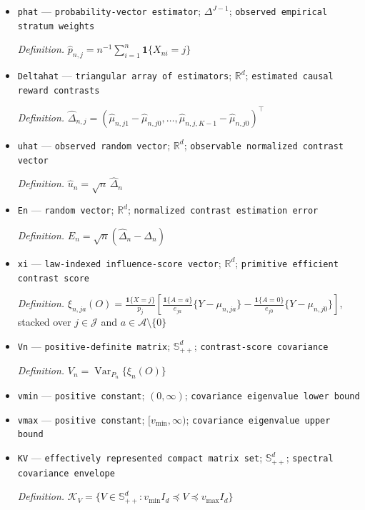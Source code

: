 \documentclass{article}
\begin{document}
\begin{itemize}
  \item \texttt{phat} --- \texttt{probability-\allowbreak{}vector estimator}; \(\Delta^{J-1}\); \texttt{observed empirical stratum weights}
  \par\smallskip\noindent\emph{Definition.} \(\widehat p_{n,j}=n^{-1}\sum_{i=1}^n\mathbf 1\{X_{ni}=j\}\)
  \item \texttt{Deltahat} --- \texttt{triangular array of estimators}; \(\mathbb R^d\); \texttt{estimated causal reward contrasts}
  \par\smallskip\noindent\emph{Definition.} \(\widehat\Delta_{n,j}=(\widehat\mu_{n,j1}-\widehat\mu_{n,j0},\ldots,\widehat\mu_{n,j,K-1}-\widehat\mu_{n,j0})^{\top}\)
  \item \texttt{uhat} --- \texttt{observed random vector}; \(\mathbb R^d\); \texttt{observable normalized contrast vector}
  \par\smallskip\noindent\emph{Definition.} \(\widehat u_n=\sqrt n\,\widehat\Delta_n\)
  \item \texttt{En} --- \texttt{random vector}; \(\mathbb R^d\); \texttt{normalized contrast estimation error}
  \par\smallskip\noindent\emph{Definition.} \(E_n=\sqrt n(\widehat\Delta_n-\Delta_n)\)
  \item \texttt{xi} --- \texttt{law-\allowbreak{}indexed influence-\allowbreak{}score vector}; \(\mathbb R^d\); \texttt{primitive efficient contrast score}
  \par\smallskip\noindent\emph{Definition.} \(\xi_{n,ja}(O)=\frac{\mathbf 1\{X=j\}}{p_j}\left[\frac{\mathbf 1\{A=a\}}{e_{ja}}\{Y-\mu_{n,ja}\}-\frac{\mathbf 1\{A=0\}}{e_{j0}}\{Y-\mu_{n,j0}\}\right]\), stacked over \(j\in\mathcal J\) and \(a\in\mathcal A\setminus\{0\}\)
  \item \texttt{Vn} --- \texttt{positive-\allowbreak{}definite matrix}; \(\mathbb S_{++}^{d}\); \texttt{contrast-\allowbreak{}score covariance}
  \par\smallskip\noindent\emph{Definition.} \(V_n=\operatorname{Var}_{P_n}\{\xi_n(O)\}\)
  \item \texttt{vmin} --- \texttt{positive constant}; \((0,\infty)\); \texttt{covariance eigenvalue lower bound}
  \item \texttt{vmax} --- \texttt{positive constant}; \([v_{\min},\infty)\); \texttt{covariance eigenvalue upper bound}
  \item \texttt{KV} --- \texttt{effectively represented compact matrix set}; \(\mathbb S_{++}^{d}\); \texttt{spectral covariance envelope}
  \par\smallskip\noindent\emph{Definition.} \(\mathcal K_V=\{V\in\mathbb S_{++}^{d}:v_{\min}I_d\preceq V\preceq v_{\max}I_d\}\)

\end{itemize}
\end{document}
